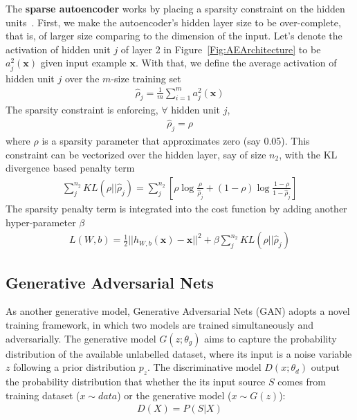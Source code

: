 The \textbf{sparse autoencoder} works by placing a sparsity constraint on the hidden units~\cite{SparseAE}.
First, we make the autoencoder's hidden layer size to be over-complete,
that is, of larger size comparing to the dimension of the input.
Let's denote the activation of hidden unit $j$ of layer 2 in Figure~\ref{Fig:AEArchitecture}
to be $a^2_j(\mathbf{x})$ given input example $\mathbf{x}$.
With that, we define the average activation of hidden unit $j$ over the $m$-size
training set
\begin{align}
    \hat{\rho}_j = \frac{1}{m} \sum_{i=1}^{m} a^2_j(\mathbf{x})
\end{align}
The sparsity constraint is enforcing, $\forall$ hidden unit $j$,
\begin{align}
    \hat{\rho}_j = \rho
\end{align}
where $\rho$ is a sparsity parameter that approximates zero (say 0.05).
This constraint can be vectorized over the hidden layer, say of size $n_2$,
with the KL divergence based penalty term
\begin{align}
    \sum_j^{n_2} KL(\rho || \hat{\rho}_j)
    = \sum_j^{n_2} [\rho \log \frac{\rho}{\hat{\rho}_j} + (1 - \rho) \log \frac{1-\rho}{1-\hat{\rho}_j} ]
\end{align}
The sparsity penalty term is integrated into the cost function by adding another hyper-parameter $\beta$
\begin{align}
    L(W, b) = \frac{1}{2}||h_{W,b}(\mathbf{x}) - \mathbf{x}||^2 +
    \beta \sum_j^{n_2} KL(\rho || \hat{\rho}_j)
\end{align}
\fi

\iffalse
\subsection{Generative Adversarial Nets}
As another generative model, Generative Adversarial Nets (GAN)\cite{GAN} adopts a novel training framework,
in which two models are trained simultaneously and adversarially.
The generative model $G(z;\theta_g)$ aims to capture the probability distribution of the available unlabelled dataset,
where its input is a noise variable $z$ following a prior distribution $p_z$.
The discriminative model $D(x;\theta_d)$ output the probability distribution that whether the its input source $S$ comes
from training dataset ($x\sim data$) or the generative model ($x \sim G(z)$):
\begin{align}
    D(X) = P(S|X)
\end{align}

